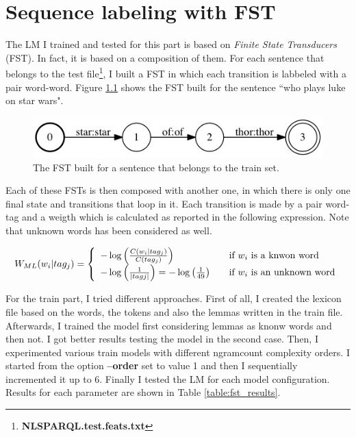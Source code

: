 \documentclass[a4paper,7pt,oneside]{book}
\begin{document}
\chapter{Sequence labeling with FST}

The LM I trained and tested for this part is based on \textit{Finite State Transducers} (FST). In fact, it is based on a composition of them. For each sentence that belongs to the test file\footnote{\textbf{NLSPARQL.test.feats.txt}}, I built a FST in which each transition is labbeled with a pair word-word. Figure \ref{fig:fst_train_example} shows the FST built for the sentence ``who plays luke on star wars".

\begin{figure}[h!]
  \centering
    \includegraphics[scale=0.4]{res/fst_train_example}
    \caption{The FST built for a sentence that belongs to the train set.}
    \label{fig:fst_train_example}
\end{figure}

\noindent
Each of these FSTs is then composed with another one, in which there is only one final state and transitions that loop in it. Each transition is made by a pair word-tag and a weigth which is calculated as reported in the following expression. Note that unknown words has been considered as well.

\[ W_{ML}(w_i | tag_j) = \left\{ 
  \begin{array}{l l}
    - \log \left(\frac{C(w_i | tag_j)}{C(tag_j)}\right) & \quad \text{if $w_i$ is a knwon word}\\
    - \log \left(\frac{1}{|tagj|}\right) = - \log \left(\frac{1}{49}\right) & \quad \text{if $w_i$ is an unknown word}
  \end{array} \right.
 \]
\vspace{0.1cm}

\noindent
For the train part, I tried different approaches. First of all, I created the lexicon file based on the words, the tokens and also the lemmas written in the train file. Afterwards, I trained the model first considering lemmas as knonw words and then not. I got better results testing the model in the second case. Then, I experimented various train models with different ngramcount complexity orders. I started from the option \textbf{--order} set to value 1 and then I sequentially incremented it up to 6. Finally I tested the LM for each model configuration. Results for each parameter are shown in Table \ref{table:fst_results}.
\end{document}
